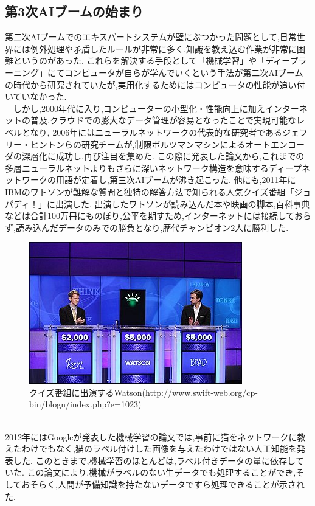 \subsection{第3次AIブームの始まり}
第二次AIブームでのエキスパートシステムが壁にぶつかった問題として,日常世界には例外処理や矛盾したルールが非常に多く,知識を教え込む作業が非常に困難というのがあった.
これらを解決する手段として「機械学習」や「ディープラーニング」にてコンピュータが自らが学んでいくという手法が第二次AIブームの時代から研究されていたが,実用化するためにはコンピュータの性能が追い付いていなかった.\\
　しかし,2000年代に入り,コンピューターの小型化・性能向上に加えインターネットの普及,クラウドでの膨大なデータ管理が容易となったことで実現可能なレベルとなり,
2006年にはニューラルネットワークの代表的な研究者であるジェフリー・ヒントンらの研究チームが,制限ボルツマンマシンによるオートエンコーダの深層化に成功し,再び注目を集めた.
この際に発表した論文から,これまでの多層ニューラルネットよりもさらに深いネットワーク構造を意味するディープネットワークの用語が定着し,第三次AIブームが沸き起こった.
他にも,2011年にIBMのワトソンが難解な質問と独特の解答方法で知られる人気クイズ番組「ジョパディ！」に出演した.\cite{webpage6}
出演したワトソンが読み込んだ本や映画の脚本,百科事典などは合計100万冊にものぼり,公平を期すため,インターネットには接続しておらず,読み込んだデータのみでの勝負となり,歴代チャンピオン2人に勝利した.
\begin{figure}[!ht]
    \begin{screen}
    \begin{center}
        \includegraphics[scale=1.1, clip]{./img/Watson.jpg}
        \caption{クイズ番組に出演するWatson\newline(http://www.swift-web.org/cp-bin/blogn/index.php?e=1023)}
        \label{fig:クイズ番組に出演するWatson}
    \end{center}
\end{screen}
\end{figure}\\
2012年にはGoogleが発表した機械学習の論文では,事前に猫をネットワークに教えたわけでもなく,猫のラベル付けした画像を与えたわけではない人工知能を発表した.\cite{ronbun3}
このときまで,機械学習のほとんどは,ラベル付きデータの量に依存していた.
この論文により,機械がラベルのない生データでも処理することができ,そしておそらく,人間が予備知識を持たないデータですら処理できることが示された.
